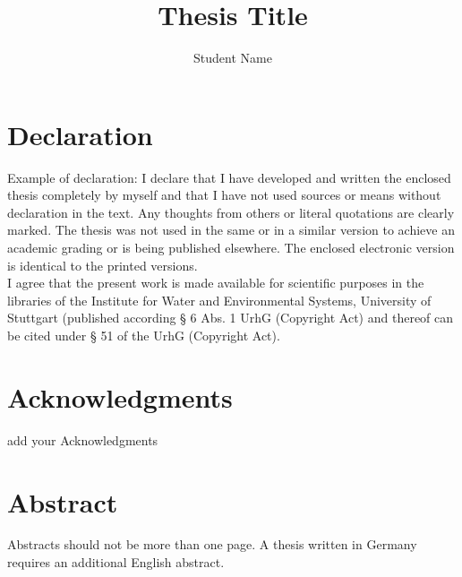 \documentclass[11pt,twoside]{thesis}
\title{\textbf{Thesis Title}} %
\author{Student Name} %
\begin{document}


\newpage\null\thispagestyle{empty}\newpage


\chapter*{Declaration}
{
	Example of declaration:
	I declare that I have developed and written the enclosed thesis completely by myself and that I have not used sources or means without declaration in the text. Any thoughts from others or literal quotations are clearly marked. The thesis was not used in the same or in a similar version to achieve an academic grading or is being published elsewhere. The enclosed electronic version is identical to the printed versions.\\
	
	I agree that the present work is made available for scientific purposes in the libraries of the Institute for Water and Environmental Systems, University of Stuttgart (published according § 6 Abs. 1 UrhG (Copyright Act) and thereof can be cited under § 51 of the UrhG (Copyright Act).
}

\chapter*{Acknowledgments}
{
add your Acknowledgments
}

\chapter*{Abstract}
{
Abstracts should not be more than one page. A thesis written in Germany requires an additional English abstract. 
}

\tableofcontents
\clearpage

\listoffigures
{}

\listoftables
{}



\pagestyle{fancy}
\fancyhf{}
\fancyhead[LE,RO]{\nouppercase{\leftmark}}
\fancyhead[RE,LO]{\nouppercase{\rightmark}}
\fancyfoot[LE,RO]{\thepage}
\renewcommand{\headrulewidth}{1.0pt}


\cleardoublepage


\end{document}
